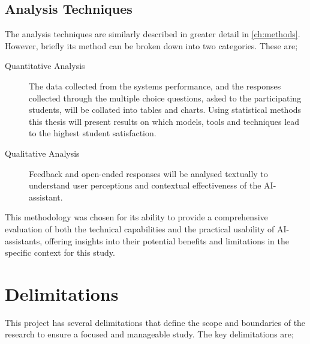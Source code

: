 \subsection{Analysis Techniques}


The analysis techniques are similarly described in greater detail in \autoref{ch:methods}. However, briefly its method can be broken down into two categories. These are;


\begin{description}
        \item[Quantitative Analysis] The data collected from the systems performance, and the responses collected through the multiple choice questions, asked to the participating students, will be collated into tables and charts. Using statistical methods this thesis will present results on which models, tools and techniques lead to the highest student satisfaction.
        \item[Qualitative Analysis] Feedback and open-ended responses will be analysed textually to understand user perceptions and contextual effectiveness of the AI-assistant.
\end{description}


This methodology was chosen for its ability to provide a comprehensive evaluation of both the technical capabilities and the practical usability of AI-assistants, offering insights into their potential benefits and limitations in the specific context for this study.




\section{Delimitations}
\label{sec:delimitations}




This project has several delimitations that define the scope and boundaries of the research to ensure a focused and manageable study. The key delimitations are;


